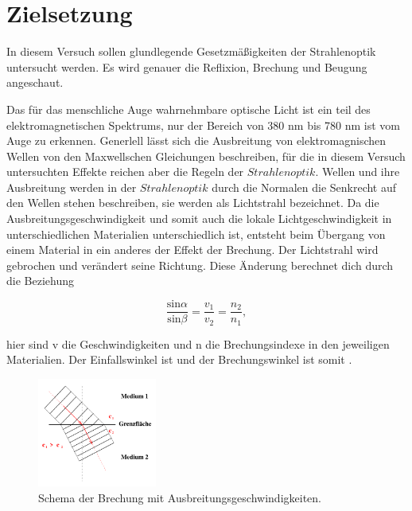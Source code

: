 \section{Zielsetzung}

    \noindent In diesem Versuch sollen glundlegende Gesetzmäßigkeiten der Strahlenoptik untersucht werden.
    Es wird genauer die Reflixion, Brechung und Beugung angeschaut.


    Das für das menschliche Auge wahrnehmbare optische Licht ist ein teil des elektromagnetischen Spektrums, nur der Bereich von 380 nm bis 780 
    nm ist vom Auge zu erkennen. Generlell lässt sich die Ausbreitung von elektromagnischen Wellen von den Maxwellschen Gleichungen beschreiben, 
    für die in diesem Versuch untersuchten Effekte reichen aber die Regeln der $Strahlenoptik$. Wellen und ihre Ausbreitung werden in der 
    $Strahlenoptik$ durch die Normalen die Senkrecht auf den Wellen stehen beschreiben, sie werden als Lichtstrahl bezeichnet. Da die 
    Ausbreitungsgeschwindigkeit und somit auch die lokale Lichtgeschwindigkeit in unterschiedlichen Materialien unterschiedlich ist, entsteht beim 
    Übergang von einem Material in ein anderes der Effekt der Brechung. Der Lichtstrahl wird gebrochen und verändert seine Richtung. 
    Diese Änderung berechnet dich durch die Beziehung

    \begin{equation}
        \frac{\text{sin}\alpha}{\text{sin} \beta} = \frac{v_1}{v_2} = \frac{n_2}{n_1},
    \end{equation}

    \noindent   hier sind v die Geschwindigkeiten und n die Brechungsindexe in den jeweiligen Materialien. Der Einfallswinkel ist \alpha und der 
    Brechungswinkel ist somit \beta.

    \begin{figure}[H]
        \centering
        \includegraphics[width=0.35\textwidth]{latex/images/T1.PNG}
        \caption{Schema der Brechung mit Ausbreitungsgeschwindigkeiten\protect \cite{400}.}
    \end{figure}

